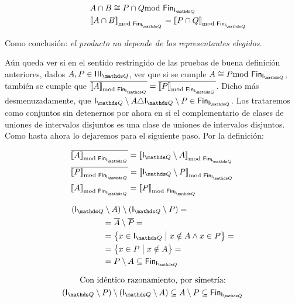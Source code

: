 \documentclass[final,12pt,a4paper,twoside,fleqn]{extbook}
\newcommand {\setCompr}[2]{
	\ensuremath{
		\left\lbrace{ 
			#1 {\;\big{\vert}\;} #2
        }\right\rbrace
    }
}
\theoremstyle{definition}
\theoremstyle{remark}
\begin{document}
\begin{align}
&\qquad\qquad A \cap B \cong P \cap Q \FinDiffRel \\
&\qquad\qquad \ClEqFinDiff{A\cap B} = \ClEqFinDiff{P\cap Q}
\end{align}


	Como conclusión: \emph{el producto no depende de los representantes elegidos.}




	Aún queda ver si en el sentido restringido de las pruebas de buena
definición anteriores, dados \(A,P \in \IIIQ\), ver que si se cumple \(A
\cong P \FinDiffRel\), también se cumple que
\(\overline{\ClEqFinDiff{A}}=\overline{\ClEqFinDiff{P}}\). Dicho más
desmenuzadamente, que \(\IQ\setminus A \triangle \IQ\setminus P \in \FinIQ\).
Los trataremos como conjuntos sin detenernos por ahora en si el
complementario de clases de uniones de intervalos disjuntos es una clase de
uniones de intervalos disjuntos. Como hasta ahora lo dejaremos para el
siguiente paso. Por la definición:



\begin{align}
&\overline{\ClEqFinDiff{A}} = \ClEqFinDiff{\IQ \setminus A}\\
&\overline{\ClEqFinDiff{P}} = \ClEqFinDiff{\IQ \setminus P}\\
&\ClEqFinDiff{A} = \ClEqFinDiff{P}\\
\end{align}



\begin{align}
&\left( \IQ \setminus A \right) \setminus \left( \IQ \setminus P \right) = \\
&\qquad\qquad = \overline{A} \setminus \overline{P} = \\
&\qquad\qquad = \setCompr{ x \in \IQ } { x \notin A \land x \in P } = \\
&\qquad\qquad = \setCompr{ x \in P } { x \notin A} = \\
&\qquad\qquad = P \setminus A \subseteq \FinIQ
\end{align}




\begin{align}
&\qquad \text{ Con idéntico razonamiento, por simetría:} \\
&\left( \IQ \setminus P \right) \setminus \left( \IQ \setminus A \right)
\subseteq  A \setminus P \subseteq \FinIQ
\end{align}
\end{document}
